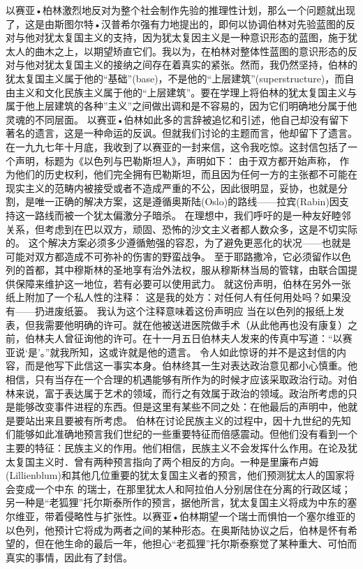 \documentclass{article}
\begin{document}
     以赛亚•柏林激烈地反对为整个社会制作先验的推理性计划，那么一个问题就出现了，这是由斯图尔特•汉普希尔强有力地提出的，即何以协调伯林对先验蓝图的反对与他对犹太复国主义的支持，因为犹太复因主义是一种意识形态的蓝图，施于犹太人的曲木之上，以期望矫直它们。我以为，在柏林对整体性蓝图的意识形态的反对与他对犹太复国主义的接纳之间存在着真实的紧张。然而，我仍然坚持，伯林的犹太复国主义属于他的“基础”(base)，不是他的“上层建筑”(superstructure)，而自由主义和文化民族主义属于他的“上层建筑”。要在学理上将伯林的犹太复国主义与属于他上层建筑的各种”主义”之间做出调和是不容易的，因为它们明确地分属于他灵魂的不同层面。
     以赛亚•伯林如此多的言辞被追忆和引述，他自己却没有留下著名的遗言，这是一种命运的反讽。但就我们讨论的主题而言，他却留下了遗言。在一九九七年十月底，我收到了以赛亚的一封来信，这令我吃惊。这封信包括了一个声明，标题为《以色列与巴勒斯坦人》，声明如下：
          由于双方都开始声称，
\newpage
作为他们的历史权利，他们完全拥有巴勒斯坦，而且因为任何一方的主张都不可能在现实主义的范畴内被接受或者不造成严重的不公，因此很明显，妥协，也就是分割，是唯一正确的解决方案，这是遵循奥斯陆(Oslo)的路线——拉宾(Rabin)因支持这一路线而被一个犹太偏激分子暗杀。
     在理想中，我们呼吁的是一种友好睦邻关系，但考虑到在巴以双方，顽固、恐怖的沙文主义者都人数众多，这是不切实际的。
     这个解决方案必须多少遵循勉强的容忍，为了避免更恶化的状况——也就是可能对双方都造成不可弥补的伤害的野蛮战争。
     至于耶路撒冷，它必须留作以色列的首都，其中穆斯林的圣地享有治外法权，服从穆斯林当局的管辖，由联合国提供保障来维护这一地位，若有必要可以使用武力。
     就这份声明，伯林在另外一张纸上附加了一个私人性的注释：
        这是我的处方：对任何人有任何用处吗？如果没有——扔进废纸篓。
     我认为这个注释意味着这份声明应
\newpage
当在以色列的报纸上发表，但我需要他明确的许可。就在他被送进医院做手术（从此他再也没有康复）之前，伯林夫人曾征询他的许可。在十一月五日伯林夫人发来的传真中写道：“以赛亚说‘是’。”就我所知，这或许就是他的遗言。
     令人如此惊讶的并不是这封信的内容，而是他写下此信这一事实本身。伯林终其一生对表达政治意见都小心慎重。他相信，只有当存在一个合理的机遇能够有所作为的时候才应该采取政治行动。对伯林来说，富于表达属于艺术的领域，而行之有效属于政治的领域。政治所考虑的只是能够改变事件进程的东西。但是这里有某些不同之处：在他最后的声明中，他就是要站出来且要被有所考虑。
     伯林在讨论民族主义的过程中，因十九世纪的先知们能够如此准确地预言我们世纪的一些重要特征而倍感震动。但他们没有看到一个主要的特征：民族主义的作用。他们相信，民族主义不会发挥什么作用。在论及犹太复国主义时．曾有两种预言指向了两个相反的方向。一种是里廉布卢姆(Lillienblum)和其他几位重要的犹太复国主义者的预言，他们预测犹太人的国家将会变成一个中东
\newpage
的瑞士，在那里犹太人和阿拉伯人分别居住在分离的行政区域；另一种是“老狐狸”托尔斯泰所作的预言，据他所言，犹太复国主义将成为中东的塞尔维亚，带着侵略性与扩张性。以赛亚•伯林期望一个瑞士而惧怕一个塞尔维亚的以色列，他预计它将成为两者之间的某种形态。在奥斯陆协议之后，伯林是怀有希望的，但在他生命的最后一年，他担心“老孤狸”托尔斯泰察觉了某种重大、可怕而真实的事情，因此有了封信。
\end{document}

